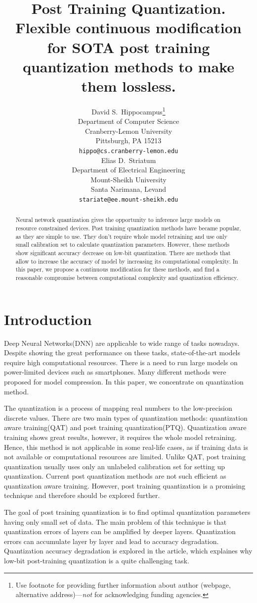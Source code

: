 \documentclass{article}
\title{Post Training Quantization. Flexible continuous modification for SOTA post training quantization methods to make them lossless.}
\author{ David S.~Hippocampus\thanks{Use footnote for providing further
		information about author (webpage, alternative
		address)---\emph{not} for acknowledging funding agencies.} \\
	Department of Computer Science\\
	Cranberry-Lemon University\\
	Pittsburgh, PA 15213 \\
	\texttt{hippo@cs.cranberry-lemon.edu} \\
	\And
	Elias D.~Striatum \\
	Department of Electrical Engineering\\
	Mount-Sheikh University\\
	Santa Narimana, Levand \\
	\texttt{stariate@ee.mount-sheikh.edu} \\
}
\date{}
\begin{document}
\maketitle

\begin{abstract}
Neural network quantization gives the opportunity to inference large models on resource constrained devices. Post training quantization methods have became popular, as they are simple to use. They don't require whole model retraining and use only small calibration set to calculate quantization parameters. However, these methods show significant accuracy decrease on low-bit quantization. There are methods that allow to increase the accuracy of model by increasing its computational complexity. In this paper, we propose a continuous modification for these methods,  and find a reasonable compromise between computational complexity and quantization efficiency.
\end{abstract}



\section{Introduction}
Deep Neural Networks(DNN) are applicable to wide range of tasks nowadays. Despite showing the great performance on these tasks, state-of-the-art models require high computational resources. There is a need to run large models on power-limited devices such as smartphones. Many different methods were proposed for model compression. In this paper, we concentrate on quantization method.

The quantization is a process of  mapping real numbers to the low-precision discrete values. There are two main types of quantization methods: quantization aware training(QAT) and post training quantization(PTQ). Quantization aware training shows great results, however, it requires the whole model retraining. Hence, this method is not applicable in some real-life cases, as if training data is not available or computational resources are limited. Unlike QAT, post training quantization usually uses only an unlabeled calibration set for setting up quantization. Current post quantization methods are not such efficient as quantization aware training. However, post training quantization is a promising technique and therefore should be explored further.

The goal of post training quantization is to find optimal quantization parameters having only small set of data. The main problem of this technique is that quantization errors of layers can be amplified by deeper layers.  Quantization errors can accumulate layer by layer and lead to accuracy degradation. Quantization accuracy degradation is explored in the \citep{loss-aware-quantization} article, which explaines why  low-bit post-training quantization is a quite challenging task.  
\end{document}
